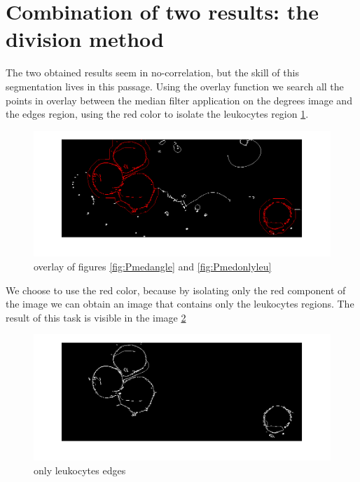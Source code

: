 \section{Combination of two results: the division method}
The two obtained results seem in no-correlation, but the skill of this segmentation lives in this passage. Using the overlay function we search all the points in overlay between the median filter application on the degrees image and the edges region, using the red color to isolate the leukocytes region \ref{fig:over}.
\begin{figure}
	\begin{center}
		\centering
		\includegraphics[scale=0.5]{img/overlay.png}
		\caption{overlay of figures \ref{fig:Pmedangle} and \ref{fig:Pmedonlyleu}}
		\label{fig:over}
	\end{center}
\end{figure}
We choose to use the red color, because by isolating only the red component of the image we can obtain an image that contains only the leukocytes regions. The result of this task is visible in the image \ref{fig:leukoover} 
\begin{figure}
	\begin{center}
		\centering
		\includegraphics[scale=0.5]{img/overLeuko.png}
		\caption{only leukocytes edges}
		\label{fig:leukoover}
	\end{center}
\end{figure}

